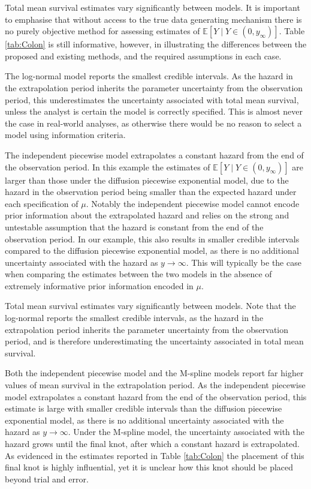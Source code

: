 \documentclass[ba,preprint]{imsart}
\theoremstyle{plain}
\theoremstyle{definition}
\theoremstyle{remark}
\begin{document}
{\color{red} Total mean survival estimates vary significantly between models. It is important to emphasise that without access to the true data generating mechanism there is no purely objective method for assessing estimates of $\mathbb{E}[Y\mid Y \in (0,y_\infty)]$. Table \ref{tab:Colon} is still informative, however, in illustrating the differences between the proposed and existing methods, and the required assumptions in each case.

The log-normal model reports the smallest credible intervals. As the hazard in the extrapolation period inherits the parameter uncertainty from the observation period, this underestimates the uncertainty associated with total mean survival, unless the analyst is certain the model is correctly specified. This is almost never the case in real-world analyses, as otherwise there would be no reason to select a model using information criteria.

The independent piecewise model extrapolates a constant hazard from the end of the observation period. In this example the estimates of $\mathbb{E}[Y\mid Y \in (0,y_\infty)]$ are larger than those under the diffusion piecewise exponential model, due to the hazard in the observation period being smaller than the expected hazard under each specification of $\mu$. Notably the independent piecewise model cannot encode prior information about the extrapolated hazard and relies on the strong and untestable assumption that the hazard is constant from the end of the observation period. In our example, this also results in smaller credible intervals compared to the diffusion piecewise exponential model, as there is no additional uncertainty associated with the hazard as $y\to\infty$. This will typically be the case when comparing the estimates between the two models in the absence of extremely informative prior information encoded in $\mu$. 


}

Total mean survival estimates vary significantly between models. Note that the log-normal reports the smallest credible intervals, as the hazard in the extrapolation period inherits the parameter uncertainty from the observation period, and is therefore underestimating the uncertainty associated in total mean survival.

Both the independent piecewise model and the M-spline models report far higher values of mean survival in the extrapolation period. As the independent piecewise model extrapolates a constant hazard from the end of the observation period, this estimate is large with smaller credible intervals than the diffusion piecewise exponential model, as there is no additional uncertainty associated with the hazard as $y\to\infty$. Under the M-spline model, the uncertainty associated with the hazard grows until the final knot, after which a constant hazard is extrapolated. As evidenced in the estimates reported in Table \ref{tab:Colon} the placement of this final knot is highly influential, yet it is unclear how this knot should be placed beyond trial and error.
\end{document}
